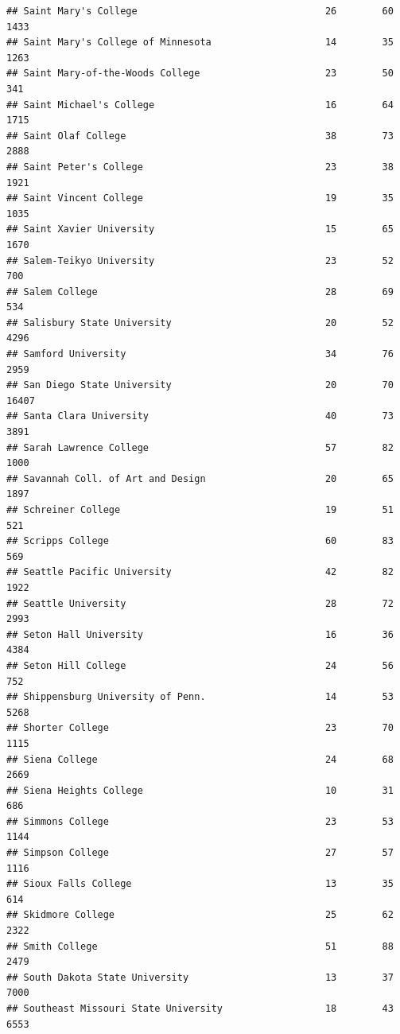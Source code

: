 \documentclass[
]{article}
\begin{document}
\begin{verbatim}
## Saint Mary's College                                 26        60        1433
## Saint Mary's College of Minnesota                    14        35        1263
## Saint Mary-of-the-Woods College                      23        50         341
## Saint Michael's College                              16        64        1715
## Saint Olaf College                                   38        73        2888
## Saint Peter's College                                23        38        1921
## Saint Vincent College                                19        35        1035
## Saint Xavier University                              15        65        1670
## Salem-Teikyo University                              23        52         700
## Salem College                                        28        69         534
## Salisbury State University                           20        52        4296
## Samford University                                   34        76        2959
## San Diego State University                           20        70       16407
## Santa Clara University                               40        73        3891
## Sarah Lawrence College                               57        82        1000
## Savannah Coll. of Art and Design                     20        65        1897
## Schreiner College                                    19        51         521
## Scripps College                                      60        83         569
## Seattle Pacific University                           42        82        1922
## Seattle University                                   28        72        2993
## Seton Hall University                                16        36        4384
## Seton Hill College                                   24        56         752
## Shippensburg University of Penn.                     14        53        5268
## Shorter College                                      23        70        1115
## Siena College                                        24        68        2669
## Siena Heights College                                10        31         686
## Simmons College                                      23        53        1144
## Simpson College                                      27        57        1116
## Sioux Falls College                                  13        35         614
## Skidmore College                                     25        62        2322
## Smith College                                        51        88        2479
## South Dakota State University                        13        37        7000
## Southeast Missouri State University                  18        43        6553

\end{verbatim}
\end{document}
